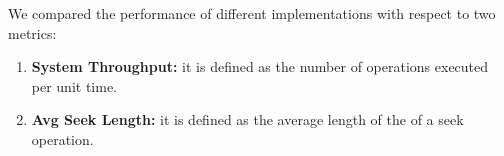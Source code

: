 We compared the performance of different implementations with respect to two metrics:
\begin{enumerate}
	\item \textbf{System Throughput:} it is defined as the number of operations executed per unit time.
	\item \textbf{Avg Seek Length:} it is defined as the average length of the \accesspath of a seek operation.
\end{enumerate}
